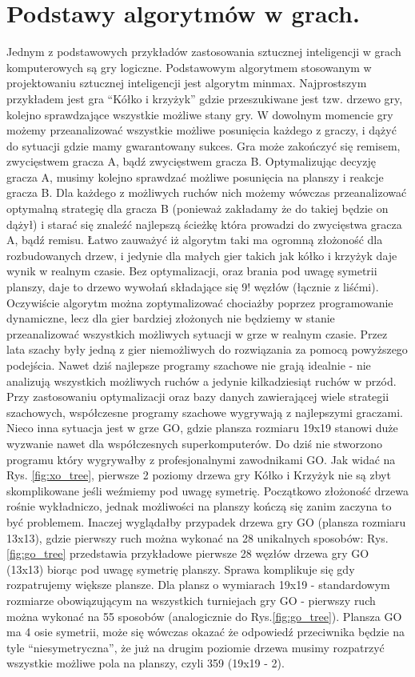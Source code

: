 \section{Podstawy algorytmów w grach.}
\begin{par}
Jednym z podstawowych przykładów zastosowania sztucznej inteligencji w grach komputerowych są gry logiczne. 
Podstawowym algorytmem stosowanym w projektowaniu sztucznej inteligencji jest algorytm minmax.
Najprostszym przykładem jest gra ``Kółko i krzyżyk'' gdzie przeszukiwane jest tzw. drzewo gry, kolejno sprawdzające wszystkie możliwe stany gry. 
W dowolnym momencie gry możemy przeanalizować wszystkie możliwe posunięcia każdego z graczy, i dążyć do sytuacji gdzie mamy gwarantowany sukces.
Gra może zakończyć się remisem, zwycięstwem gracza A, bądź zwycięstwem gracza B.
Optymalizując decyzję gracza A, musimy kolejno sprawdzać możliwe posunięcia na planszy i reakcje gracza B. 
Dla każdego z możliwych ruchów nich możemy wówczas przeanalizować optymalną strategię dla gracza B (ponieważ zakładamy że do takiej będzie on dążył) i starać się znaleźć 
najlepszą ścieżkę która prowadzi do zwycięstwa gracza A, bądź remisu.
Łatwo zauważyć iż algorytm taki ma ogromną złożoność dla rozbudowanych drzew, i jedynie dla małych gier takich jak kółko i krzyżyk daje wynik w realnym czasie.
Bez optymalizacji, oraz brania pod uwagę symetrii planszy, daje to drzewo wywołań składające się 9! węzłów (łącznie z liśćmi). 
Oczywiście algorytm można zoptymalizować chociażby poprzez programowanie dynamiczne, lecz dla gier bardziej złożonych nie będziemy w stanie przeanalizować wszystkich możliwych sytuacji w grze w realnym czasie.
Przez lata szachy były jedną z gier niemożliwych do rozwiązania za pomocą powyższego podejścia.
Nawet dziś najlepsze programy szachowe nie grają idealnie - nie analizują wszystkich możliwych ruchów a jedynie kilkadziesiąt ruchów w przód.
Przy zastosowaniu optymalizacji oraz bazy danych zawierającej wiele strategii szachowych, współczesne programy szachowe wygrywają z najlepszymi graczami.
Nieco inna sytuacja jest w grze GO, gdzie plansza rozmiaru 19x19 stanowi duże wyzwanie nawet dla współczesnych superkomputerów. 
Do dziś nie stworzono programu który wygrywałby z profesjonalnymi zawodnikami GO.
Jak widać na Rys. \ref{fig:xo_tree}, pierwsze 2 poziomy drzewa gry Kółko i Krzyżyk nie są zbyt skomplikowane jeśli weźmiemy pod uwagę symetrię.
Początkowo złożoność drzewa rośnie wykładniczo, jednak możliwości na planszy kończą się zanim zaczyna to być problemem.
Inaczej wyglądałby przypadek drzewa gry GO (plansza rozmiaru 13x13), gdzie pierwszy ruch można wykonać na 28 unikalnych sposobów: Rys. \ref{fig:go_tree} przedstawia przykładowe pierwsze 28 węzłów drzewa gry GO (13x13) biorąc pod uwagę symetrię planszy.
Sprawa komplikuje się gdy rozpatrujemy większe plansze.
Dla plansz o wymiarach 19x19 - standardowym rozmiarze obowiązującym na wszystkich turniejach gry GO - pierwszy ruch można wykonać na 55 sposobów (analogicznie do Rys.\ref{fig:go_tree}). Plansza GO ma 4 osie symetrii, może się wówczas okazać że odpowiedź przeciwnika będzie na tyle ``niesymetryczna'', że już na drugim
poziomie drzewa musimy rozpatrzyć wszystkie możliwe pola na planszy, czyli 359 (19x19 - 2).


\end{par}
